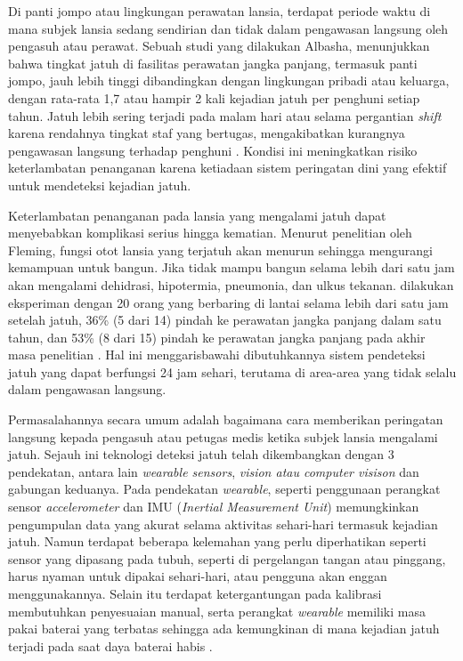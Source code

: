 Di panti jompo atau lingkungan perawatan lansia, terdapat periode waktu di mana subjek lansia sedang sendirian dan tidak dalam pengawasan langsung oleh pengasuh atau perawat. Sebuah studi yang dilakukan Albasha, menunjukkan bahwa tingkat jatuh di fasilitas perawatan jangka panjang, termasuk panti jompo, jauh lebih tinggi dibandingkan dengan lingkungan pribadi atau keluarga, dengan rata-rata 1,7 atau hampir 2 kali kejadian jatuh per penghuni setiap tahun. Jatuh lebih sering terjadi pada malam hari atau selama pergantian \textit{shift} karena rendahnya tingkat staf yang bertugas, mengakibatkan kurangnya pengawasan langsung terhadap penghuni \cite{Albasha2024}. Kondisi ini meningkatkan risiko keterlambatan penanganan karena ketiadaan sistem peringatan dini yang efektif untuk mendeteksi kejadian jatuh.\par

Keterlambatan penanganan pada lansia yang mengalami jatuh dapat menyebabkan komplikasi serius hingga kematian. Menurut penelitian oleh Fleming, fungsi otot lansia yang terjatuh akan menurun sehingga mengurangi kemampuan untuk bangun. Jika tidak mampu bangun selama lebih dari satu jam akan mengalami dehidrasi, hipotermia, pneumonia, dan ulkus tekanan. dilakukan eksperiman dengan 20 orang yang berbaring di lantai selama lebih dari satu jam setelah jatuh, 36\% (5 dari 14) pindah ke perawatan jangka panjang dalam satu tahun, dan 53\% (8 dari 15) pindah ke perawatan jangka panjang pada akhir masa penelitian \cite{Fleming2008}. Hal ini menggarisbawahi dibutuhkannya sistem pendeteksi jatuh yang dapat berfungsi 24 jam sehari, terutama di area-area yang tidak selalu dalam pengawasan langsung.\par

Permasalahannya secara umum adalah bagaimana cara memberikan peringatan langsung kepada pengasuh atau petugas medis ketika subjek lansia mengalami jatuh. Sejauh ini teknologi deteksi jatuh telah dikembangkan dengan 3 pendekatan, antara lain \textit{wearable sensors}, \textit{vision atau computer visison} dan gabungan keduanya. Pada pendekatan \textit{wearable}, seperti penggunaan perangkat sensor \textit{accelerometer} dan IMU (\textit{Inertial Measurement Unit}) memungkinkan pengumpulan data yang akurat selama aktivitas sehari-hari termasuk kejadian jatuh. Namun terdapat beberapa kelemahan yang perlu diperhatikan seperti sensor yang dipasang pada tubuh, seperti di pergelangan tangan atau pinggang, harus nyaman untuk dipakai sehari-hari, atau pengguna akan enggan menggunakannya. Selain itu terdapat ketergantungan pada kalibrasi membutuhkan penyesuaian manual, serta perangkat \textit{wearable} memiliki masa pakai baterai yang terbatas sehingga ada kemungkinan di mana kejadian jatuh terjadi pada saat daya baterai habis \cite{Mubashir2013}.

